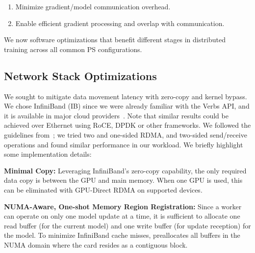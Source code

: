 \begin{enumerate}[noitemsep,topsep=0pt,parsep=0pt,partopsep=0pt]
\item Minimize gradient/model communication overhead.
\item Enable efficient gradient processing and overlap with communication.
\end{enumerate}

We now software optimizations that benefit different stages in distributed training across all common PS configurations. %

\subsection{Network Stack Optimizations}
\label{sec:IBOptimization}
We sought to mitigate data movement latency with zero-copy and kernel bypass. We chose InfiniBand (IB) since we were already familiar with the Verbs API, and it is available in major cloud providers~\cite{AzureWin5:online}. Note that similar results could be achieved over Ethernet using RoCE, DPDK or other frameworks. We followed the guidelines from~\cite{rdma}; we tried two and one-sided RDMA, and two-sided send/receive operations and found similar performance in our workload. We briefly highlight some implementation details:

\noindent \textbf{Minimal Copy:} Leveraging InfiniBand's zero-copy capability, the only required data copy is between the GPU and main memory. When one GPU is used, this can be eliminated with GPU-Direct RDMA on supported devices.

\noindent \textbf{NUMA-Aware, One-shot Memory Region Registration:} Since a worker can operate on only one model update at a time, it is sufficient to allocate one read buffer (for the current model) and one write buffer (for update reception) for the model. To minimize InfiniBand cache misses, \phub preallocates all buffers in the NUMA domain where the card resides as a contiguous block.

